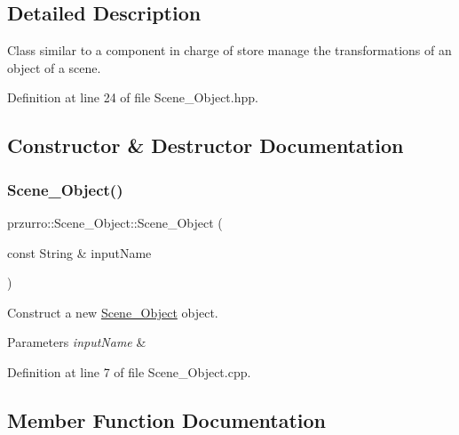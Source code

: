 \subsection{Detailed Description}
Class similar to a component in charge of store manage the transformations of an object of a scene. 



Definition at line 24 of file Scene\+\_\+\+Object.\+hpp.



\subsection{Constructor \& Destructor Documentation}
\mbox{\label{classprzurro_1_1_scene___object_ad67d8974378a4eedea6027cb750eed4d}} 
\subsubsection{\texorpdfstring{Scene\_Object()}{Scene\_Object()}}
{\footnotesize\ttfamily przurro\+::\+Scene\+\_\+\+Object\+::\+Scene\+\_\+\+Object (\begin{DoxyParamCaption}\item[{const String \&}]{input\+Name }\end{DoxyParamCaption})}



Construct a new \mbox{\hyperlink{classprzurro_1_1_scene___object}{Scene\+\_\+\+Object}} object. 


\begin{DoxyParams}{Parameters}
{\em input\+Name} & \\
\hline
\end{DoxyParams}


Definition at line 7 of file Scene\+\_\+\+Object.\+cpp.



\subsection{Member Function Documentation}
\mbox{\label{classprzurro_1_1_scene___object_a219f3f9d5543ae2b40d4d623ae61b0ce}} 
